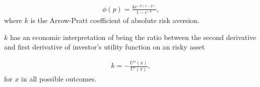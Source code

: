 \begin{align}
	\phi(p) =\frac{k e^{-k(1-p)}}{1-e^{-k}} , \label{eq:phi}
	\end{align}
where $k$ is the Arrow-Pratt coefficient of absolute risk aversion. \medskip

$k$ has an economic interpretation of being the ratio between the second derivative and first derivative
of investor's utility function on an risky asset

\begin{align}
	k = -\frac{U''(x)}{U'(x)},
	\end{align}
for $x$ in all possible outcomes.



